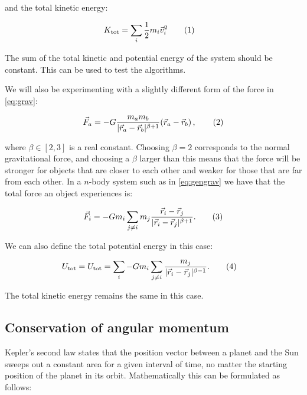\documentclass[reprint,english,notitlepage]{revtex4-1}  %
\newcommand\numberthis{\addtocounter{equation}{1}\tag{\theequation}}
\begin{document}
and the total kinetic energy:

\begin{align*}
K_\text{tot} &= \sum\limits_i \frac{1}{2}m_i \vec{v}_i^2 \numberthis \label{eq:tot_kin_en}
\end{align*}

The sum of the total kinetic and potential energy of the system should be constant. This can be used to test the algorithms.

We will also be experimenting with a slightly different form of the force in \eqref{eq:grav}:

\begin{align*}
\vec{F}_a = - G \frac{m_a m_b}{|\vec{r}_a - \vec{r}_b|^{\beta + 1} } ( \vec{r}_a - \vec{r}_b) \, , \numberthis \label{eq:beta_grav}
\end{align*}

where $\beta \in [2,3]$ is a real constant. Choosing $\beta = 2$ corresponds to the normal gravitational force, and choosing a $\beta$ larger than this means that the force will be stronger for objects that are closer to each other and weaker for those that are far from each other. In a $n$-body system such as in \eqref{eq:gengrav} we have that the total force an object experiences is:

\begin{align*}
\vec{F}_{i} = -Gm_{i}\sum_{j\neq i}m_{j}\frac{\vec{r}_{i}-\vec{r}_{j}}{|\vec{r}_{i}-\vec{r}_{j}|^{\beta + 1}}. \numberthis \label{eq:beta_gengrav}
\end{align*}

We can also define the total potential energy in this case:

\begin{align*}
U_\text{tot} = U_\text{tot} &= \sum\limits_i - G m_i \sum\limits_{j\neq i} \frac{m_j}{|\vec{r}_i - \vec{r}_j|^{\beta-1}} . \numberthis \label{eq:beta_tot_pot_en}
\end{align*}

The total kinetic energy remains the same in this case.

\subsection{Conservation of angular momentum} \label{sec:II:c}

Kepler's second law states that the position vector between a planet and the Sun sweeps out a constant area for a given interval of time, no matter the starting position of the planet in its orbit. Mathematically this can be formulated as follows:
\end{document}
